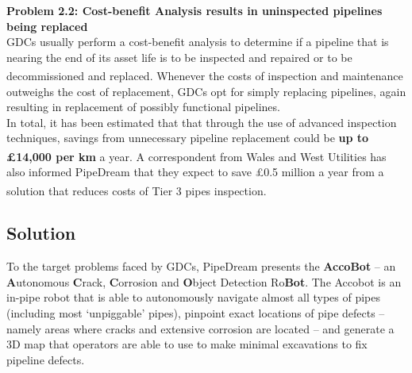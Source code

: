 \documentclass[11pt]{article}		%
\newcommand{\supercite}[1]{\textsuperscript{\cite{#1}}}		%
\begin{document}
    \textbf{Problem 2.2: Cost-benefit Analysis results in uninspected pipelines being replaced}\\
    GDCs usually perform a cost-benefit analysis to determine if a pipeline that is nearing the end of its asset life is to be inspected and repaired or to be decommissioned and replaced\supercite{CBA}. Whenever the costs of inspection and maintenance outweighs the cost of replacement, GDCs opt for simply replacing pipelines, again resulting in replacement of possibly functional pipelines. 
    \\ \hspace*{3ex} In total, it has been estimated that that through the use of advanced inspection techniques, savings from unnecessary pipeline replacement could be \textbf{up to £14,000 per km} a year\supercite{GRAID}. A correspondent from Wales and West Utilities has also informed PipeDream that they expect to save £0.5 million a year from a solution that reduces costs of Tier 3 pipes inspection\supercite{WWU}. 

	\subsection[Solution]{Solution}
    To the target problems faced by GDCs, PipeDream presents the \textbf{AccoBot} – an \textbf{A}utonomous \textbf{C}rack, \textbf{C}orrosion and \textbf{O}bject Detection Ro\textbf{Bot}. 
    The Accobot is an in-pipe robot that is able to autonomously navigate almost all types of pipes (including most ‘unpiggable’ pipes), pinpoint exact locations of pipe defects – namely areas where cracks and extensive corrosion are located – and generate a 3D map that operators are able to use to make minimal excavations to fix pipeline defects. 
	
\end{document}
